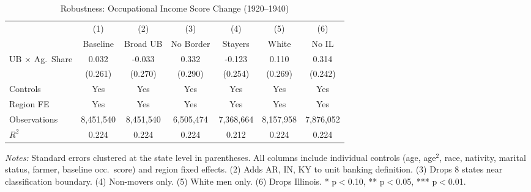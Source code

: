 \begin{table}[H]
\centering
\caption{Robustness: Occupational Income Score Change (1920--1940)}
\begin{threeparttable}
\begin{tabular}{lcccccc}
\toprule
& (1) & (2) & (3) & (4) & (5) & (6) \\
& Baseline & Broad UB & No Border & Stayers & White & No IL \\
\midrule
UB $\times$ Ag.\ Share & 0.032 & -0.033 & 0.332 & -0.123 & 0.110 & 0.314 \\
& (0.261) & (0.270) & (0.290) & (0.254) & (0.269) & (0.242) \\
\midrule
Controls & Yes & Yes & Yes & Yes & Yes & Yes \\
Region FE & Yes & Yes & Yes & Yes & Yes & Yes \\
Observations & 8,451,540 & 8,451,540 & 6,505,474 & 7,368,664 & 8,157,958 & 7,876,052 \\
$R^2$ & 0.224 & 0.224 & 0.224 & 0.212 & 0.224 & 0.224 \\
\bottomrule
\end{tabular}
\begin{tablenotes}[flushleft]
\small
\item \textit{Notes:} Standard errors clustered at the state level in parentheses. All columns include individual controls (age, age$^2$, race, nativity, marital status, farmer, baseline occ.\ score) and region fixed effects. (2) Adds AR, IN, KY to unit banking definition. (3) Drops 8 states near classification boundary. (4) Non-movers only. (5) White men only. (6) Drops Illinois. * p$<$0.10, ** p$<$0.05, *** p$<$0.01.
\end{tablenotes}
\end{threeparttable}
\label{tab:robustness}
\end{table}
